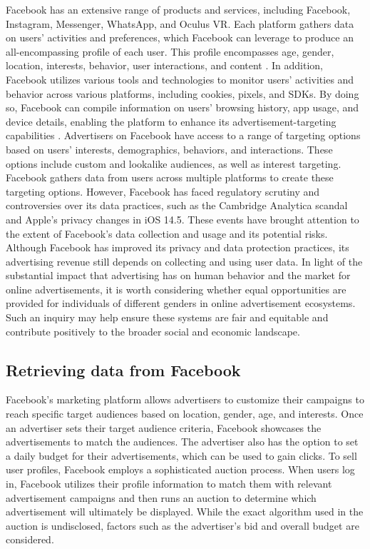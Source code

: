 \documentclass[twocolumn]{bmcart}\usepackage{lineno}
\begin{document}
Facebook has an extensive range of products and services, including Facebook, Instagram, Messenger, WhatsApp, and Oculus VR. Each platform gathers data on users' activities and preferences, which Facebook can leverage to produce an all-encompassing profile of each user. This profile encompasses age, gender, location, interests, behavior, user interactions, and content \cite{fb-products}. In addition, Facebook utilizes various tools and technologies to monitor users' activities and behavior across various platforms, including cookies, pixels, and SDKs. By doing so, Facebook can compile information on users' browsing history, app usage, and device details, enabling the platform to enhance its advertisement-targeting capabilities \cite{facebook_ad_targeting}. 
Advertisers on Facebook have access to a range of targeting options based on users' interests, demographics, behaviors, and interactions. These options include custom and lookalike audiences, as well as interest targeting. Facebook gathers data from users across multiple platforms to create these targeting options. However, Facebook has faced regulatory scrutiny and controversies over its data practices, such as the Cambridge Analytica scandal\cite{rosenberg2018trump} and Apple's privacy changes in iOS 14.5\cite{verge2021}. These events have brought attention to the extent of Facebook's data collection and usage and its potential risks. Although Facebook has improved its privacy and data protection practices, its advertising revenue still depends on collecting and using user data. In light of the substantial impact that advertising has on human behavior and the market for online advertisements, it is worth considering whether equal opportunities are provided for individuals of different genders in online advertisement ecosystems. Such an inquiry may help ensure these systems are fair and equitable and contribute positively to the broader social and economic landscape.

\subsection{Retrieving data from Facebook}
Facebook's marketing platform allows advertisers to customize their campaigns to reach specific target audiences based on location, gender, age, and interests. Once an advertiser sets their target audience criteria, Facebook showcases the advertisements to match the audiences. The advertiser also has the option to set a daily budget for their advertisements, which can be used to gain clicks. To sell user profiles, Facebook employs a sophisticated auction process. When users log in, Facebook utilizes their profile information to match them with relevant advertisement campaigns and then runs an auction to determine which advertisement will ultimately be displayed. While the exact algorithm used in the auction is undisclosed, factors such as the advertiser's bid and overall budget are considered.
\end{document}
